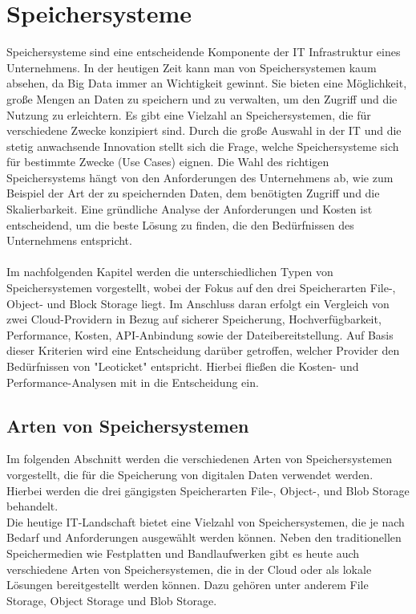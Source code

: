 \chapter{Speichersysteme}

Speichersysteme sind eine entscheidende Komponente der IT Infrastruktur eines Unternehmens. In der heutigen Zeit kann man von Speichersystemen kaum absehen, da Big Data immer an Wichtigkeit gewinnt. Sie bieten eine Möglichkeit, große Mengen an Daten zu speichern und zu verwalten, um den Zugriff und die Nutzung zu erleichtern. Es gibt eine Vielzahl an Speichersystemen, die für verschiedene Zwecke konzipiert sind. Durch die große Auswahl in der IT und die stetig anwachsende Innovation stellt sich die Frage, welche Speichersysteme sich für bestimmte Zwecke (Use Cases) eignen. Die Wahl des richtigen Speichersystems hängt von den Anforderungen des Unternehmens ab, wie zum Beispiel der Art der zu speichernden Daten, dem benötigten Zugriff und die Skalierbarkeit. Eine gründliche Analyse der Anforderungen und Kosten ist entscheidend, um die beste Lösung zu finden, die den Bedürfnissen des Unternehmens entspricht.\\
\\ 
Im nachfolgenden Kapitel werden die unterschiedlichen Typen von Speichersystemen vorgestellt, wobei der Fokus auf den drei Speicherarten File-, Object- und Block Storage liegt. Im Anschluss daran erfolgt ein Vergleich von zwei Cloud-Providern in Bezug auf sicherer Speicherung, Hochverfügbarkeit, Performance, Kosten, API-Anbindung sowie der Dateibereitstellung. Auf Basis dieser Kriterien wird eine Entscheidung darüber getroffen, welcher Provider den Bedürfnissen von "Leoticket" entspricht. Hierbei fließen die Kosten- und Performance-Analysen mit in die Entscheidung ein.

\newpage

\section{Arten von Speichersystemen}

Im folgenden Abschnitt werden die verschiedenen Arten von Speichersystemen vorgestellt, die für die Speicherung von digitalen Daten verwendet werden. Hierbei werden die drei gängigsten Speicherarten File-, Object-, und Blob Storage behandelt.\\
 
Die heutige IT-Landschaft bietet eine Vielzahl von Speichersystemen, die je nach Bedarf und Anforderungen ausgewählt werden können. Neben den traditionellen Speichermedien wie Festplatten und Bandlaufwerken gibt es heute auch verschiedene Arten von Speichersystemen, die in der Cloud oder als lokale Lösungen bereitgestellt werden können. Dazu gehören unter anderem File Storage, Object Storage und Blob Storage.\\


